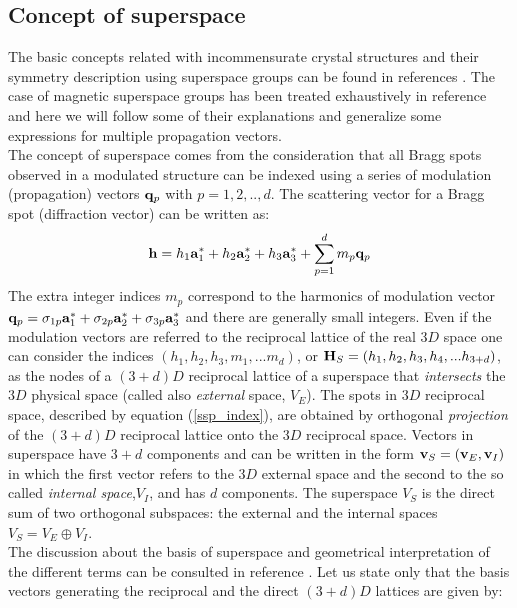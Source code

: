 \documentclass[10pt]{article}
\begin{document}
\subsection{Concept of superspace}
\label{concepts}
The basic concepts related with incommensurate crystal structures and their symmetry description using superspace groups can be found in references \cite {deWolff1, deWolff2, deWolff3, Janner,Janssen-Acta, JCB,van Smaalen}. The case of magnetic superspace groups has been treated exhaustively in reference \cite{Mag_SuperSpace} and here we will follow some of their explanations and generalize some expressions for multiple propagation vectors.\\ 
The concept of superspace comes from the consideration that all Bragg spots observed in a modulated structure can be indexed using a series of modulation (propagation) vectors ${\bf q}_p$ with $p=1,2,.., d$. The scattering vector for a Bragg spot (diffraction vector) can be written as:
\begin{equation} \label{ssp_index}
{\bf h}=h_1{\bf a}_1^*+h_2{\bf a}_2^*+h_3{\bf a}_3^*+\sum \limits_{p=1}^{d} m_p {\bf q}_p
\end{equation}
The extra integer indices $m_p$ correspond to the harmonics of modulation vector ${\bf q}_p=\sigma_{1p}{\bf a}_1^*+\sigma_{2p}{\bf a}_2^*+\sigma_{3p}{\bf a}_3^*$ and there are generally small integers. Even if the modulation vectors are referred to the reciprocal lattice of the real $3D$ space one can consider the indices  $(h_1, h_2, h_3, m_1, ...m_d)$, or ${\bf H}_S=(h_1, h_2, h_3, h_4, ...h_{3+d})$, as the nodes of a $(3+d)D$ reciprocal lattice of a superspace that {\it intersects} the $3D$ physical space (called also {\it external} space, $V_E$). The spots in $3D$ reciprocal space, described by equation (\ref{ssp_index}), are obtained by orthogonal {\it projection} of the $(3+d)D$ reciprocal lattice onto the $3D$ reciprocal space. Vectors in superspace have $3+d$ components and can be written in the form ${\bf v}_S =({\bf v}_E,{\bf v}_I)$ in which the first vector refers to the $3D$ external space and the second to the so called {\it internal space},$V_I$, and has $d$ components. The superspace  $V_S$ is the direct sum of two orthogonal subspaces: the external and the internal spaces $V_S=V_E \oplus V_I$. \\
The discussion about the basis of superspace and geometrical interpretation of the different terms can be consulted in reference \cite{van Smaalen}. Let us state only that the basis vectors generating the reciprocal and the direct $(3+d)D$ lattices are given by:
\end{document}
